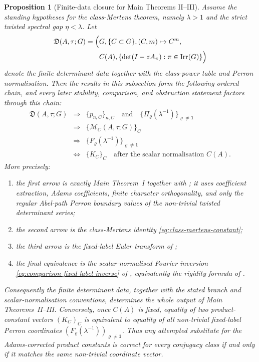 \documentclass[11pt,a4paper]{amsart}
\theoremstyle{plain}
\newtheorem{proposition}[theorem]{Proposition}
\theoremstyle{definition}
\theoremstyle{remark}
\DeclareMathOperator{\Irr}{Irr}
\begin{document}
\begin{proposition}[Finite-data closure for Main Theorems II--III]
  \label{prop:class-mertens-product-dependency-chain}
  Assume the standing hypotheses for the class-Mertens theorem, namely
  \(\lambda>1\) and the strict twisted spectral gap
  \(\eta<\lambda\).  Let
  \[
  \begin{aligned}
    \mathfrak D(A,\tau;G)=
    \Bigl(&G,\{C\subset G\},(C,m)\mapsto C^m,\\
      &C(A),\{\det(I-zA_\pi):\pi\in\Irr(G)\}\Bigr)
  \end{aligned}
  \]
  denote the finite determinant data together with the class-power table
  and Perron normalisation.  Then the results in this subsection form the
  following ordered chain, and every later stability, comparison, and
  obstruction statement factors through this chain:
  \[
  \begin{array}{ccl}
    \mathfrak D(A,\tau;G)&\Longrightarrow&
      \{p_{n,C}\}_{n,C}\quad\text{and}\quad
      \{\Pi_\varrho(\lambda^{-1})\}_{\varrho\ne\mathbf1}\\[0.4ex]
    &\Longrightarrow&
      \{\mathcal M_C(A,\tau;G)\}_C\\[0.4ex]
    &\Longrightarrow&
      \{F_\varrho(\lambda^{-1})\}_{\varrho\ne\mathbf1}\\[0.4ex]
    &\Longleftrightarrow&
      \{K_C\}_C\quad\text{after the scalar normalisation }C(A).
  \end{array}
  \]
  More precisely:
  \begin{enumerate}[label=\textup{(\roman*)},leftmargin=*]
    \item the first arrow is exactly Main Theorem~I together with
    ; it uses coefficient extraction,
    Adams coefficients, finite character orthogonality, and only the regular
    Abel-path Perron boundary values of the non-trivial twisted determinant
    series;
    \item the second arrow is the class-Mertens identity
    \eqref{eq:class-mertens-constant};
    \item the third arrow is the fixed-label Euler transform of
    ;
    \item the final equivalence is the scalar-normalised Fourier inversion
    \eqref{eq:comparison-fixed-label-inverse} of
    , equivalently the rigidity formula
    of .
  \end{enumerate}
  Consequently the finite determinant data, together with the stated
  branch and scalar-normalisation conventions, determines the whole output of
  Main Theorems~II--III.  Conversely, once \(C(A)\) is fixed, equality of two
  product-constant vectors \((K_C)_C\) is equivalent to equality of all
  non-trivial fixed-label Perron coordinates
  \((F_\varrho(\lambda^{-1}))_{\varrho\ne\mathbf1}\).  Thus any attempted
  substitute for the Adams-corrected product constants is correct for every
  conjugacy class if and only if it matches the same non-trivial coordinate
  vector.


\end{proposition}
\end{document}
